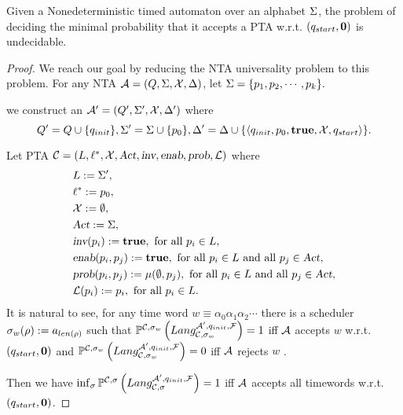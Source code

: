 \begin{proposition}
Given a Nonedeterministic timed automaton over an alphabet $\Sigma$, the problem of deciding 
the minimal probability that it accepts a PTA w.r.t. $(q_{start},\mathbf{0})$ is undecidable.
\end{proposition}

\begin{proof}
We reach our goal by reducing the NTA universality problem to this problem.
For any NTA $\mathcal{A} = (Q,\Sigma,\mathcal{X},\Delta)$, let $\Sigma = \{p_{1}, p_{2}, \cdots, p_{k}\}.$

we construct an $\mathcal{A}' = (Q', \Sigma', \mathcal{X}, \Delta')$ where
$$
    Q'   = Q  \cup \{ q_{init} \},
    \Sigma'  = \Sigma \cup \{ p_{0} \},
    \Delta'     = \Delta    \cup \{ \langle
            q_{init},
            p_{0},
            \mathbf{true},
            \mathcal{X},
            q_{start}
        \rangle
    \}.
$$

Let PTA $\mathcal{C}=\left(L, \ell^*, \mathcal{X}, \mbox{\sl Act}, \mbox{\sl inv}, \mbox{\sl enab},  \mbox{\sl prob}, \mathcal{L}\right)$ where
\begin{align*}
    &L      :=  \Sigma',\\
    &\ell^*     :=  p_{0}, \\
    &\mathcal{X}    :=  \emptyset, \\
    &\mbox{\sl Act}      :=  \Sigma, \\ 
    &\mbox{\sl inv}(p_{i})                :=  \mathbf{true}, 
                                    \text{ for all } p_{i} \in L,\\
    &\mbox{\sl enab}(p_{i},p_{j})     :=  \mathbf{true},
                                    \text{ for all } p_{i} \in L \text{ and all } p_{j} \in \mbox{\sl Act},\\
    &\mbox{\sl prob}(p_{i},p_{j})     :=  \mu(\emptyset,p_{j}), 
                                    \text{ for all } p_{i} \in L \text{ and all } p_{j} \in \mbox{\sl Act},\\
    &\mathcal{L}(p_{i})             :=  p_{i},
                                    \text{ for all } p_{i} \in L.
\end{align*}
It is natural to see, for any time word $ w \equiv \alpha_0 \alpha_1 \alpha_2 \cdots $
there is a scheduler $ \sigma_w (\rho ) := a_{len(\rho)} $ such that $ \mathbb{P}^{\mathcal{C},\sigma_w }\left( Lang _{\mathcal{C},\sigma_w} ^{\mathcal{A}',q_{init},\mathcal{F}} \right) = 1 $
iff $\mathcal{A}$ accepts $w$ w.r.t. $(q_{start},\mathbf{0})$ and $\mathbb{P}^{\mathcal{C},\sigma_w }\left( Lang _{\mathcal{C},\sigma_w} ^{\mathcal{A}',q_{init},\mathcal{F}} \right) = 0$ iff $\mathcal{A}$ rejects $w$ .

Then we have
$
\inf_\sigma \mathbb{P}^{\mathcal{C},\sigma}\left(
    Lang _{\mathcal{C},\sigma} ^{\mathcal{A}',q_{init},\mathcal{F}}
\right)
    = 1
$
iff
$\mathcal{A}$ accepts all timewords w.r.t. $(q_{start},\mathbf{0})$.

\end{proof}
